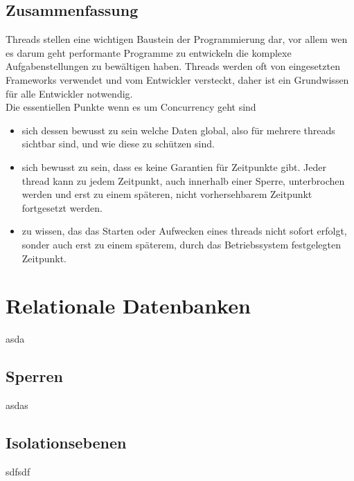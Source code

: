\subsection{Zusammenfassung}
Threads stellen eine wichtigen Baustein der Programmierung dar, vor allem wen es darum geht performante Programme zu entwickeln die komplexe Aufgabenstellungen zu bewältigen haben. Threads werden oft von eingesetzten Frameworks verwendet und vom Entwickler versteckt, daher ist ein Grundwissen für alle Entwickler notwendig. 
\\Die essentiellen Punkte wenn es um Concurrency geht sind
\begin{itemize}
	\item sich dessen bewusst zu sein welche Daten global, also für mehrere threads sichtbar sind, und wie diese zu schützen sind. 
	\item sich bewusst zu sein, dass es keine Garantien für Zeitpunkte gibt. Jeder thread kann zu jedem Zeitpunkt, auch innerhalb einer Sperre, unterbrochen werden und erst zu einem späteren, nicht vorhersehbarem Zeitpunkt fortgesetzt werden.
	\item zu wissen, das das Starten oder Aufwecken eines threads nicht sofort erfolgt, sonder auch erst zu einem späterem, durch das Betriebssystem festgelegten Zeitpunkt.
\end{itemize}


\section{Relationale Datenbanken}
asda
\subsection{Sperren}
asdas
\subsection{Isolationsebenen}
sdfsdf

\chapterend
